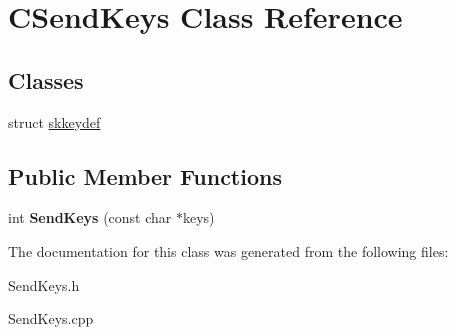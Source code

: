 \hypertarget{class_c_send_keys}{\section{C\-Send\-Keys Class Reference}
\label{class_c_send_keys}
}
\subsection*{Classes}
\begin{DoxyCompactItemize}
\item 
struct \hyperlink{struct_c_send_keys_1_1skkeydef}{skkeydef}
\end{DoxyCompactItemize}
\subsection*{Public Member Functions}
\begin{DoxyCompactItemize}
\item 
\hypertarget{class_c_send_keys_a6ed04ce3bfb7045cf4ff4962ff3a02ed}{int {\bfseries Send\-Keys} (const char $\ast$keys)}\label{class_c_send_keys_a6ed04ce3bfb7045cf4ff4962ff3a02ed}

\end{DoxyCompactItemize}


The documentation for this class was generated from the following files\-:\begin{DoxyCompactItemize}
\item 
Send\-Keys.\-h\item 
Send\-Keys.\-cpp\end{DoxyCompactItemize}
